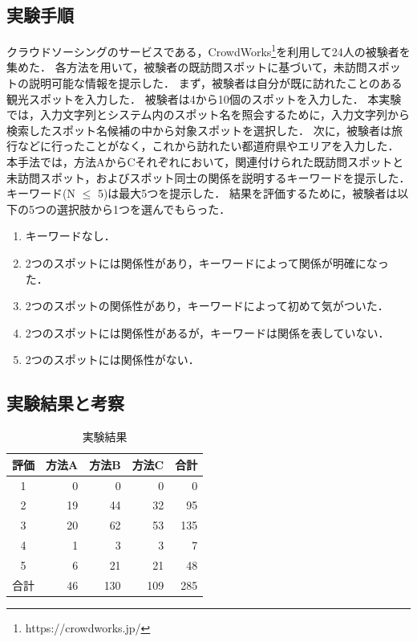 \documentclass{deimj}
\begin{document}
\subsection{実験手順}
\label{subsec:実験手順}
クラウドソーシングのサービスである，CrowdWorks\footnote{https://crowdworks.jp/}を利用して24人の被験者を集めた．
各方法を用いて，被験者の既訪問スポットに基づいて，未訪問スポットの説明可能な情報を提示した．
まず，被験者は自分が既に訪れたことのある観光スポットを入力した．
被験者は4から10個のスポットを入力した．
本実験では，入力文字列とシステム内のスポット名を照会するために，入力文字列から検索したスポット名候補の中から対象スポットを選択した．
次に，被験者は旅行などに行ったことがなく，これから訪れたい都道府県やエリアを入力した．
本手法では，方法AからCそれぞれにおいて，関連付けられた既訪問スポットと未訪問スポット，およびスポット同士の関係を説明するキーワードを提示した．
キーワード(N $\le$ 5)は最大5つを提示した．
結果を評価するために，被験者は以下の5つの選択肢から1つを選んでもらった．
\begin{enumerate}
  \item キーワードなし．
  \item 2つのスポットには関係性があり，キーワードによって関係が明確になった．
  \item 2つのスポットの関係性があり，キーワードによって初めて気がついた．
  \item 2つのスポットには関係性があるが，キーワードは関係を表していない．
  \item 2つのスポットには関係性がない．
\end{enumerate}

\subsection{実験結果と考察}

\begin{table}[t]
  \caption{実験結果}
  \label{table:実験結果}
  \centering
  \begin{tabular}{c|r|r|r|r}
  \hline
  評価 & \multicolumn{1}{c|}{方法A} & \multicolumn{1}{c|}{方法B} & \multicolumn{1}{c|}{方法C} &  \multicolumn{1}{c}{合計} \\ \hline
  1  & 0                      & 0                      & 0                       & 0                      \\
  2  & 19                     & 44                     & 32                     & 95                    \\
  3  & 20                     & 62                     & 53                      & 135                    \\
  4  & 1                      & 3                      & 3                      & 7                     \\
  5  & 6                      & 21                     & 21                     & 48                     \\\hline
  合計 & 46                     & 130                    & 109                    & 285                    \\ \hline
  \end{tabular}
\end{table}
\end{document}
